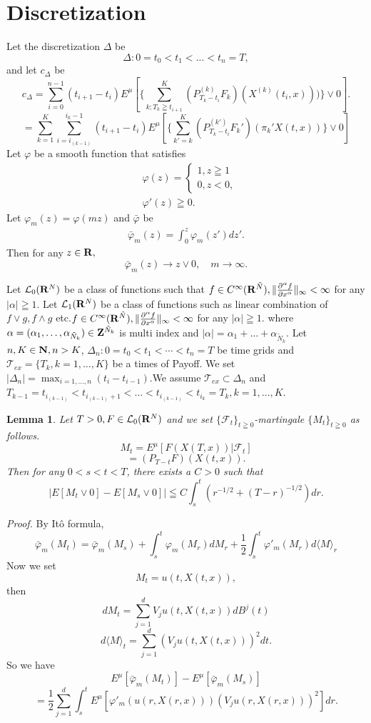 \documentclass[12pt]{article}
\newtheorem{lem}[thm]{Lemma}%
\begin{document}
\section{Discretization}
Let the discretization $\Delta $ be
$$\Delta: 0=t_0 < t_1 < \ldots < t_n = T,$$
and let $c_{\Delta}$ be
$$c_{\Delta}=\sum_{i=0}^{n-1}(t_{i+1}-t_i)E^{\mu}[\{\sum_{k; T_k \geqq t_{i+1}}^K(P_{T_k-t_i}^{(k)}F_k)(X^{(k)}(t_i,x))) \}\vee 0].
$$
$$
=\sum_{k=1}^K\sum_{i=i_{(k-1)}}^{{i_{k}}-1}(t_{i+1}-t_i) E^{\mu}[ \{\sum_{k'=k}^K(P_{T_k-t_i}^{(k')}F_k')(\pi_k' X(t,x))\}\vee0 ]
 $$
Let $\varphi$ be a smooth function that satisfies
\begin{align*}
&\varphi(z)=
\begin{cases}
1 , z\geqq 1\\
0, z<0,
\end{cases}\\
&\varphi' (z) \geqq 0.
\end{align*}
Let $\varphi_m(z)=\varphi(mz)$ and $\bar{\varphi}$ be 
\begin{align*}
\bar{\varphi}_m(z)=\int_{0}^z \varphi_m(z')dz'.
\end{align*}
Then for any $z \in {\bf R},$
$$\bar{\varphi}_m(z) \to z \vee 0 , \quad m\to \infty.$$

Let $\mathcal{L}_0({\bf R}^N)$ be a class of functions such that 
$f \in C^{\infty}({\bf R}^{\tilde{N}}),\|\frac{\partial^{\alpha}f}{\partial x^{\alpha}}\|_{\infty} <\infty$ for any $|\alpha| \geqq 1.$
Let $\mathcal{L}_1({\bf R}^N)$ be a class of functions such as  linear combination of $f \vee g, f \wedge g$ etc.$f \in C^{\infty}({\bf R}^{\tilde{N}}),\|\frac{\partial^{\alpha}f}{\partial x^{\alpha}}\|_{\infty} <\infty$ for any $|\alpha| \geqq 1.$
where $\alpha=(\alpha_1,\ldots, \alpha_{\tilde{N}_k})\in {\bf Z}^{\tilde{N}_k}$ is multi index and $|\alpha|=\alpha_1+\ldots+ \alpha_{\tilde{N}_k}$.
Let $n, K \in {\bf N}, n> K$,  $\Delta_n: 0 = t_0 < t_1 < \cdots < t_n = T$ be time grids and 
$\mathcal{T}_{ex} = \{T_k, k=1,\ldots,K\}$ be a times of Payoff.
We set $|\Delta_n| = \max_{i=1,\ldots,n}(t_i-t_{i-1})$.We assume $\mathcal{T}_{ex} \subset \Delta_n$ and
$T_{k-1}=t_{i_{(k-1)}} <t_{i_{(k-1)}+1}  < \ldots < t_{i_{(k-1)}} <t_{i_{k}}=T_k, k=1,\ldots, K.$

\begin{lem}\label{discLem2}
Let $T>0, F \in \mathcal{L}_0({\bf R}^N)$ and we set $\{\mathcal{F}_t\}_{t\geqq 0}$-martingale $\{M_t\}_{t\geqq 0}$
as follows.
$$M_t = E^{\mu}[F(X(T,x))|\mathcal{F}_t]$$ 
$$=(P_{T-t}F)(X(t,x)).$$
Then for any $0< s < t< T$, there exists a $C>0$ such that 
$$|E[M_t \vee 0]-E[M_s \vee 0]|\leqq C \int_{s}^t(r^{-1/2}+(T-r)^{-1/2})dr .$$
\end{lem}
{\it Proof.}
By It\^o formula, 
$$\bar{\varphi}_m(M_t)=\bar{\varphi}_m(M_s)+\int_s^t\varphi_m(M_r)dM_r+\frac{1}{2}\int_s^t\varphi'_m(M_r)d\langle M \rangle_r$$
Now we set $$M_t=u(t,X(t,x)),$$ then
$$dM_t=\sum_{j=1}^d V_j u(t,X(t,x))dB^j(t)$$
$$d\langle M \rangle_t=\sum_{j=1}^d (V_j u(t,X(t,x)))^2dt.$$
So we have
$$E^{\mu}[\bar{\varphi}_m(M_t)]-E^{\mu}[\bar{\varphi}_m(M_s)]$$
$$=\frac{1}{2}\sum_{j=1}^d \int_s^t E^{\mu}[\varphi'_m( u(r,X(r,x)) ) (V_j u(r,X(r,x)))^2] dr.$$
\end{document}
